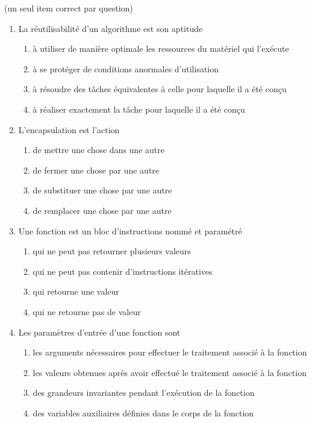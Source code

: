 \begin{td}[QCM (3)]\label{td:qcm3}
 (un seul item correct par question)
\em
\begin{enumerate}
\item La réutilisabilité d'un algorithme est son aptitude
	\begin{enumerate}
	\item à utiliser de manière optimale les ressources du matériel qui l'exécute
	\item à se protéger de conditions anormales d'utilisation
	\item à résoudre des tâches équivalentes à celle pour laquelle il a été conçu
	\item à réaliser exactement la tâche pour laquelle il a été conçu
	\end{enumerate}

\item L'encapsulation est l'action
	\begin{enumerate}
	\item de mettre une chose dans une autre
	\item de fermer une chose par une autre
	\item de substituer une chose par une autre
	\item de remplacer une chose par une autre
	\end{enumerate}
	
\item Une fonction est un bloc d'instructions nommé et paramétré 
	\begin{enumerate}
	\item qui ne peut pas retourner plusieurs valeurs
	\item qui ne peut pas contenir d'instructions itératives
	\item qui retourne une valeur
	\item qui ne retourne pas de valeur
	\end{enumerate}

\item Les paramètres d'entrée d'une fonction sont
	\begin{enumerate}
	\item les arguments nécessaires pour effectuer le traitement associé à la fonction
	\item les valeurs obtenues après avoir effectué le traitement associé à la fonction
	\item des grandeurs invariantes pendant l'exécution de la fonction
	\item des variables auxiliaires définies dans le corps de la fonction
	\end{enumerate}
	

\end{enumerate}
\end{td}
